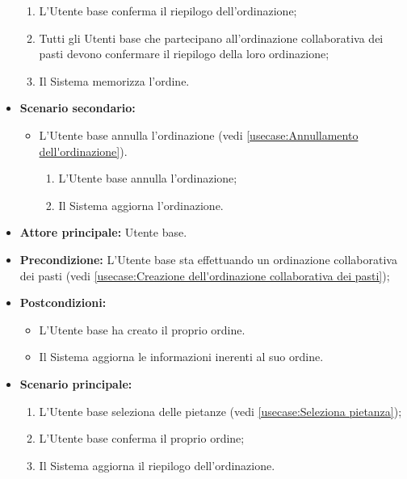 \begin{itemize}
\begin{enumerate}
		      \item L'Utente base conferma il riepilogo dell'ordinazione;

		      \item Tutti gli Utenti base che partecipano all'ordinazione collaborativa dei pasti devono
		            confermare il riepilogo della loro ordinazione;
		      \item Il Sistema memorizza l'ordine.
	      \end{enumerate}

	\item \textbf{Scenario secondario:}
	      \begin{itemize}
		      \item L'Utente base annulla l'ordinazione (vedi
		            \autoref{usecase:Annullamento dell'ordinazione}).
		            \begin{enumerate}
			            \item L'Utente base annulla l'ordinazione;
			            \item Il Sistema aggiorna l'ordinazione.
		            \end{enumerate}
	      \end{itemize}
\end{itemize}


\label{usecase:Creazione della propria ordinazione}
\begin{itemize}
	\item \textbf{Attore principale:} Utente base.

	\item \textbf{Precondizione:} L'Utente base sta effettuando un ordinazione collaborativa dei pasti (vedi \autoref{usecase:Creazione dell'ordinazione collaborativa dei pasti});

	\item \textbf{Postcondizioni:}
	      \begin{itemize}
		      \item L'Utente base ha creato il proprio ordine.
		      \item Il Sistema aggiorna le informazioni inerenti al suo ordine.
	      \end{itemize}

	\item \textbf{Scenario principale:}
	      \begin{enumerate}
		      \item L'Utente base seleziona delle pietanze (vedi \autoref{usecase:Seleziona pietanza});
		      \item L'Utente base conferma il proprio ordine;
		      \item Il Sistema aggiorna il riepilogo dell'ordinazione.
	      \end{enumerate}
\end{itemize}


